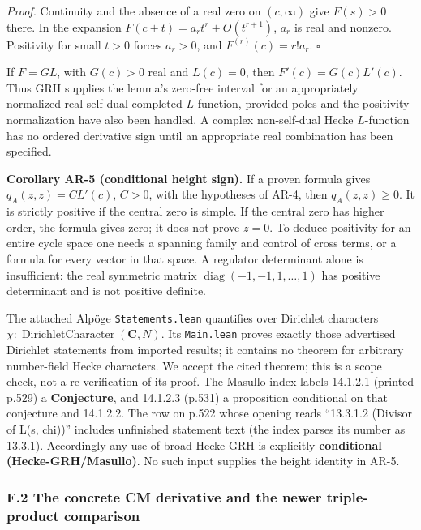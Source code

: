 \emph{Proof.} Continuity and the absence of a real zero on
\((c,\infty)\) give \(F(s)>0\) there. In the expansion
\(F(c+t)=a_rt^r+O(t^{r+1})\), \(a_r\) is real and nonzero. Positivity
for small \(t>0\) forces \(a_r>0\), and \(F^{(r)}(c)=r!a_r\).
\(\square\)

If \(F=G L\), with \(G(c)>0\) real and \(L(c)=0\), then
\(F'(c)=G(c)L'(c)\). Thus GRH supplies the lemma's zero-free interval
for an appropriately normalized real self-dual completed \(L\)-function,
provided poles and the positivity normalization have also been handled.
A complex non-self-dual Hecke \(L\)-function has no ordered derivative
sign until an appropriate real combination has been specified.

\textbf{Corollary AR-5 (conditional height sign).} If a proven formula
gives \(q_A(z,z)=C L'(c)\), \(C>0\), with the hypotheses of AR-4, then
\(q_A(z,z)\ge0\). It is strictly positive if the central zero is simple.
If the central zero has higher order, the formula gives zero; it does
not prove \(z=0\). To deduce positivity for an entire cycle space one
needs a spanning family and control of cross terms, or a formula for
every vector in that space. A regulator determinant alone is
insufficient: the real symmetric matrix
\(\operatorname{diag}(-1,-1,1,\ldots,1)\) has positive determinant and
is not positive definite.

The attached Alpöge \texttt{Statements.lean} quantifies over Dirichlet
characters \(\chi:\operatorname{DirichletCharacter}(\mathbf C,N)\). Its
\texttt{Main.lean} proves exactly those advertised Dirichlet statements
from imported results; it contains no theorem for arbitrary number-field
Hecke characters. We accept the cited theorem; this is a scope check,
not a re-verification of its proof. The Masullo index labels 14.1.2.1
(printed p.529) a \textbf{Conjecture}, and 14.1.2.3 (p.531) a
proposition conditional on that conjecture and 14.1.2.2. The row on
p.522 whose opening reads ``13.3.1.2 (Divisor of L(s, chi))'' includes
unfinished statement text (the index parses its number as 13.3.1).
Accordingly any use of broad Hecke GRH is explicitly \textbf{conditional
(Hecke-GRH/Masullo)}. No such input supplies the height identity in
AR-5.

\subsubsection{F.2 The concrete CM derivative and the newer
triple-product
comparison}\label{f.2-the-concrete-cm-derivative-and-the-newer-triple-product-comparison}

